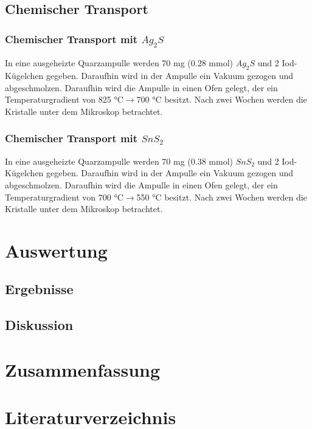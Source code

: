 \documentclass[12pt, a4paper]{article}
\begin{document}
\subsection{Chemischer Transport}
\subsubsection{\texorpdfstring{Chemischer Transport mit $Ag_2S$}{Chemischer Transport mit Ag2S}}
{In eine ausgeheizte Quarzampulle werden 70 mg (0.28 mmol) $Ag_2S$ und 2 Iod-Kügelchen gegeben. Daraufhin wird in der Ampulle ein Vakuum gezogen und abgeschmolzen. Daraufhin wird die Ampulle in einen Ofen gelegt, der ein Temperaturgradient von 
825 °C$\rightarrow$700 °C besitzt. Nach zwei Wochen werden die Kristalle unter dem Mikroskop betrachtet.\cite{Skript}



}
\subsubsection{\texorpdfstring{Chemischer Transport mit $SnS_2$}{Chemischer Transport mit SnS2}}
{In eine ausgeheizte Quarzampulle werden 70 mg (0.38 mmol) $SnS_2$ und 2 Iod-Kügelchen gegeben. Daraufhin wird in der Ampulle ein Vakuum gezogen und abgeschmolzen. Daraufhin wird die Ampulle in einen Ofen gelegt, der ein Temperaturgradient von 
700 °C$\rightarrow$550 °C besitzt. Nach zwei Wochen werden die Kristalle unter dem Mikroskop betrachtet.\cite{Skript}
}




\newpage
\section{Auswertung}
\subsection{Ergebnisse}
\subsection{Diskussion}



\newpage
\section{Zusammenfassung}
\cite{Skript}



\newpage
\section{Literaturverzeichnis}
\printbibliography
\end{document}
